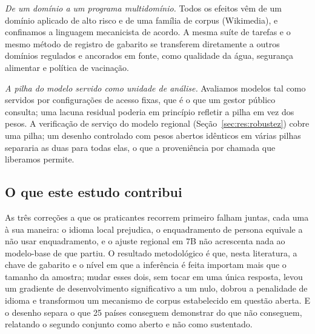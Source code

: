 \emph{De um domínio a um programa multidomínio.} Todos os efeitos vêm de um
domínio aplicado de alto risco e de uma família de corpus (Wikimedia), e
confinamos a linguagem mecanicista de acordo. A mesma suíte de tarefas e o
mesmo método de registro de gabarito se transferem diretamente a outros
domínios regulados e ancorados em fonte, como qualidade da água, segurança
alimentar e política de vacinação.

\emph{A pilha do modelo servido como unidade de análise.} Avaliamos modelos
tal como servidos por configurações de acesso fixas, que é o que um gestor
público consulta; uma lacuna residual poderia em princípio refletir a pilha em
vez dos pesos. A verificação de serviço do modelo regional
(Seção~\ref{sec:res:robustez}) cobre uma pilha; um desenho controlado com
pesos abertos idênticos em várias pilhas separaria as duas para todas elas, o
que a proveniência por chamada que liberamos permite.

\subsection{O que este estudo contribui}

As três correções a que os praticantes recorrem primeiro falham juntas, cada
uma à sua maneira: o idioma local prejudica, o enquadramento de persona equivale
a não usar enquadramento, e o ajuste regional em 7B não acrescenta nada ao
modelo-base de que partiu. O resultado metodológico é que, nesta literatura, a
chave de gabarito e o nível em que a inferência é feita importam mais que o
tamanho da amostra; mudar esses dois, sem tocar em uma única resposta, levou um
gradiente de desenvolvimento significativo a um nulo, dobrou a penalidade de
idioma e transformou um mecanismo de corpus estabelecido em questão aberta. E o
desenho separa o que 25 países conseguem demonstrar do que não conseguem,
relatando o segundo conjunto como aberto e não como sustentado.
